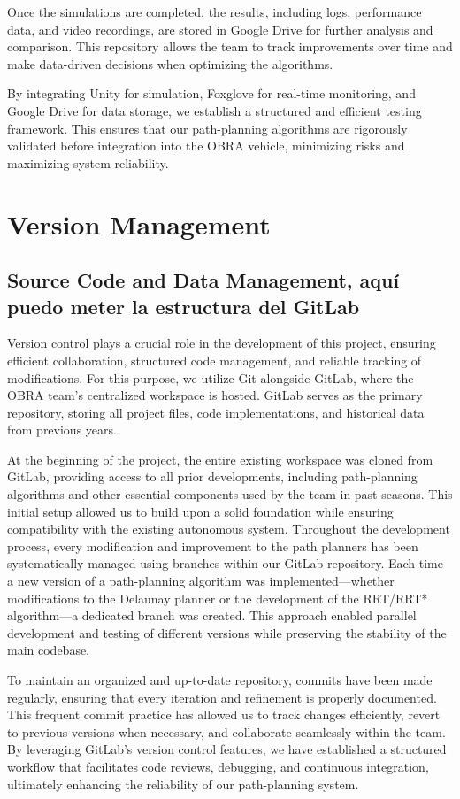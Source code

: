 \documentclass[a4paper,11pt]{report}
\begin{document}
Once the simulations are completed, the results, including logs, performance data, and video recordings, are stored in Google Drive for further analysis and comparison. This repository allows the team to track improvements over time and make data-driven decisions when optimizing the algorithms.

By integrating Unity for simulation, Foxglove for real-time monitoring, and Google Drive for data storage, we establish a structured and efficient testing framework. This ensures that our path-planning algorithms are rigorously validated before integration into the OBRA vehicle, minimizing risks and maximizing system reliability.

\section{Version Management}

\subsection{Source Code and Data Management, aquí puedo meter la estructura del GitLab}

Version control plays a crucial role in the development of this project, ensuring efficient collaboration, structured code management, and reliable tracking of modifications. For this purpose, we utilize Git alongside GitLab, where the OBRA team's centralized workspace is hosted. GitLab serves as the primary repository, storing all project files, code implementations, and historical data from previous years.

At the beginning of the project, the entire existing workspace was cloned from GitLab, providing access to all prior developments, including path-planning algorithms and other essential components used by the team in past seasons. This initial setup allowed us to build upon a solid foundation while ensuring compatibility with the existing autonomous system. Throughout the development process, every modification and improvement to the path planners has been systematically managed using branches within our GitLab repository. Each time a new version of a path-planning algorithm was implemented—whether modifications to the Delaunay planner or the development of the RRT/RRT* algorithm—a dedicated branch was created. This approach enabled parallel development and testing of different versions while preserving the stability of the main codebase.

To maintain an organized and up-to-date repository, commits have been made regularly, ensuring that every iteration and refinement is properly documented. This frequent commit practice has allowed us to track changes efficiently, revert to previous versions when necessary, and collaborate seamlessly within the team. By leveraging GitLab's version control features, we have established a structured workflow that facilitates code reviews, debugging, and continuous integration, ultimately enhancing the reliability of our path-planning system.
\end{document}
